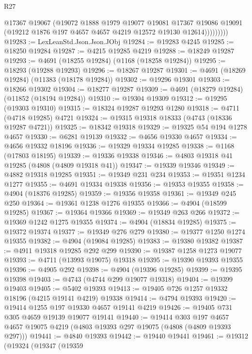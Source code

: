 \begin{lexlean}{R27}
\begin{coremodule}
                  @17367
                  @19067
                  (@19072
                    @1888
                    @1979
                    @19077
                    @19081
                    @17367
                    @19086
                    @19091
                    (@19212 @1876 @197 @4657 @4657 @4219 @12572 @19130 @12614)))))))))
@19283 := LexLeanStd.Json.Json.JObj
@19284 := @19283 @4245
@19285 := @18250 @19284
@19287 := @4215 @19285 @4219
@19288 := @18249 @19287
@19293 := @4691 (@18255 @19284) (@1168 (@18258 @19284))
@19295 := @18293 (@19288 @19293)
@19296 := @18267 @19287
@19301 := @4691 (@18269 @19284) (@11383 (@18178 @19284))
@19302 := @19296 @19301
@19303 := @18266 @19302
@19304 := @18277 @19287
@19309 := @4691 (@18279 @19284) (@11852 (@18194 @19284))
@19310 := @19304 @19309
@19312 := @19295 (@19303 @19310)
@19315 := @18324 @19287 @19293 @1280
@19318 := @4711 (@4718 @19285) @4721
@19324 := @19315 @19318 @18333 (@4743 (@18336 @19287 @4721))
@19325 := @18342 @19318
@19329 := @19325 @54 @194 @1278 @4657
@19330 := @6281 @19139
@19332 := @4656 @19330 @4657
@19334 := @4656 @19332 @18196
@19336 := @19329 @19334 @19285
@19338 := @1168 (@17803 @18195)
@19339 := @19336 @19338
@19346 := @4803 @19318 @41 @19285 (@4808 (@4809 @19318 @41))
@19347 := @19339 @19346
@19349 := @4882 @19318 @19285
@19351 := @19349 @231 @234
@19353 := @19351 @1234 @1277
@19355 := @4691 @19334 @19338
@19356 := @19353 @19355
@19358 := @4904 (@18376 @19285)
@19359 := @19356 @19358
@19361 := @19349 @245 @250
@19364 := @19361 @1238 @1276 @19355
@19366 := @4904 (@18599 @19285)
@19367 := @19364 @19366
@19369 := @19349 @263 @266
@19372 := @19369 @1242 @1275 @19355
@19374 := @4904 (@18834 @19285)
@19375 := @19372 @19374
@19377 := @19349 @276 @279
@19380 := @19377 @1250 @1274 @19355
@19382 := @4904 (@19084 @19285)
@19383 := @19380 @19382
@19387 := @4911 @19318 @19285 @292 @299
@19390 := @19387 @1258 @1273 @19077
@19393 := @4711 (@13993 @19075) @19318
@19395 := @19390 @19393 @19355
@19396 := @4905 @292
@19398 := @4904 (@19396 @19285)
@19399 := @19395 @19398
@19403 := @4743 (@4744 @299 @19077 @19318)
@19404 := @19399 @19403
@19405 := @5402 @19393
@19413 := @19405 @726 @1257 @19332 @18196 (@4215 @19141 @4219) @19338
@19414 := @4794 @19393
@19420 := @19414 @1255 @197 @19330 @4657 @19141 @4219
@19426 := @19405 @731 @305 @4659 @19139 @19077 @19141
@19440 := @19414
    @303
    @197
    @4657
    @4657
    @19075
    @4219
    (@4803 @19393 @297 @19075 (@4808 (@4809 @19393 @297)))
@19441 := @4840 @19393
@19442 := @19440 @19441
@19461 := @19312
    (@19324
      (@19347
        (@19359

\end{coremodule}
\end{lexlean}
